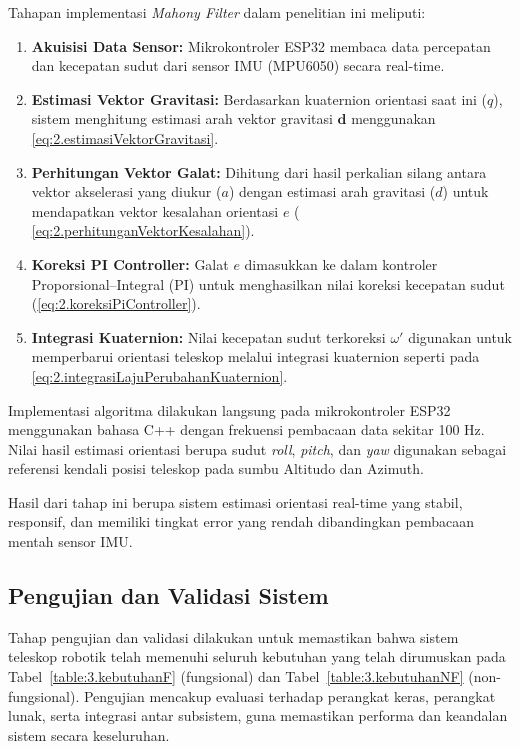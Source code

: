 Tahapan implementasi \textit{Mahony Filter} dalam penelitian ini meliputi:  
\begin{enumerate}[noitemsep]
	\item \textbf{Akuisisi Data Sensor:} Mikrokontroler ESP32 membaca data percepatan dan kecepatan sudut dari sensor IMU (MPU6050) secara real-time.
	\item \textbf{Estimasi Vektor Gravitasi:} Berdasarkan kuaternion orientasi saat ini ($q$), sistem menghitung estimasi arah vektor gravitasi $\mathbf{d}$ menggunakan \ref{eq:2.estimasiVektorGravitasi}.
	\item \textbf{Perhitungan Vektor Galat:} Dihitung dari hasil perkalian silang antara vektor akselerasi yang diukur ($a$) dengan estimasi arah gravitasi ($d$) untuk mendapatkan vektor kesalahan orientasi $e$ ( \ref{eq:2.perhitunganVektorKesalahan}).
	\item \textbf{Koreksi PI Controller:} Galat $e$ dimasukkan ke dalam kontroler Proporsional–Integral (PI) untuk menghasilkan nilai koreksi kecepatan sudut (\ref{eq:2.koreksiPiController}).
	\item \textbf{Integrasi Kuaternion:} Nilai kecepatan sudut terkoreksi $\omega'$ digunakan untuk memperbarui orientasi teleskop melalui integrasi kuaternion seperti pada \ref{eq:2.integrasiLajuPerubahanKuaternion}.
\end{enumerate}

Implementasi algoritma dilakukan langsung pada mikrokontroler ESP32 menggunakan bahasa C++ dengan frekuensi pembacaan data sekitar 100 Hz. Nilai hasil estimasi orientasi berupa sudut \textit{roll}, \textit{pitch}, dan \textit{yaw} digunakan sebagai referensi kendali posisi teleskop pada sumbu Altitudo dan Azimuth.  

Hasil dari tahap ini berupa sistem estimasi orientasi real-time yang stabil, responsif, dan memiliki tingkat error yang rendah dibandingkan pembacaan mentah sensor IMU.\par

\subsection{Pengujian dan Validasi Sistem} \label{III.Metode.Uji}

Tahap pengujian dan validasi dilakukan untuk memastikan bahwa sistem teleskop robotik telah memenuhi seluruh kebutuhan yang telah dirumuskan pada Tabel~\ref{table:3.kebutuhanF} (fungsional) dan Tabel~\ref{table:3.kebutuhanNF} (non-fungsional). Pengujian mencakup evaluasi terhadap perangkat keras, perangkat lunak, serta integrasi antar subsistem, guna memastikan performa dan keandalan sistem secara keseluruhan. \par

